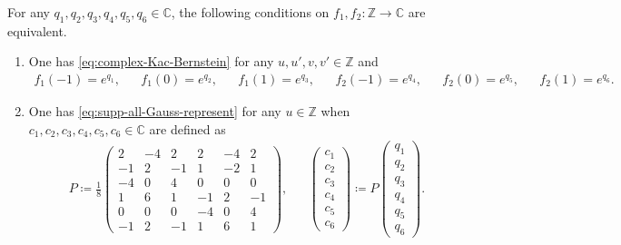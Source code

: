 \documentclass[10pt,a4paper]{amsart}
\begin{document}
\begin{lemma}
  \label{lem:supp-all}

For any $ q_1 , q_2 , q_3 , q_4 , q_5 , q_6 \in \mathbb{ C } $, the following conditions on $ f_1 , f_2 \colon \mathbb{ Z } \to \mathbb{ C } $ are equivalent.

\begin{enumerate}
    \item \label{item:supp-all-Kac-Bernstein}

    One has \eqref{eq:complex-Kac-Bernstein} for any $ u , u' , v , v' \in \mathbb{ Z } $ and
    \begin{align}
    f_1 ( - 1 ) = e^{ q_1 } , & &
    f_1 ( 0 ) = e^{ q_2 } , & &
    f_1 ( 1 ) = e^{ q_3 } , & &
    f_2 ( - 1 ) = e^{ q_4 } , & &
    f_2 ( 0 ) = e^{ q_5 } , & &
    f_2 ( 1 ) = e^{ q_6 }. \label{eq:supp-all-Kac-Bernstein-exponent}
\end{align}

\item \label{item:supp-all-Gauss}

One has \eqref{eq:supp-all-Gauss-represent} for any $ u \in \mathbb{ Z } $ when $ c_1 , c_2 , c_3 , c_4 , c_5 , c_6 \in \mathbb{ C } $ are defined as
\begin{align}
    P \coloneqq \frac{ 1 }{ 8 }
    \begin{pmatrix}
    2 & - 4 & 2 & 2 & - 4 & 2 \\
    - 1 & 2 & - 1 & 1 & - 2 & 1 \\
    - 4 & 0 & 4 & 0 & 0 & 0 \\
    1 & 6 & 1 & - 1 & 2 & - 1 \\
    0 & 0 & 0 & - 4 & 0 & 4 \\
    - 1 & 2 & - 1 & 1 & 6 & 1
  \end{pmatrix}, & &
  \begin{pmatrix}
    c_1 \\
    c_2 \\
    c_3 \\
    c_4 \\
    c_5 \\
    c_6
  \end{pmatrix}
  \coloneqq P
  \begin{pmatrix}
    q_1 \\
    q_2 \\
    q_3 \\
    q_4 \\
    q_5 \\
    q_6
  \end{pmatrix}
  .
  \label{eq:supp-all-Gauss-const-def}
\end{align}
    
\end{enumerate}

\end{lemma}
\end{document}
